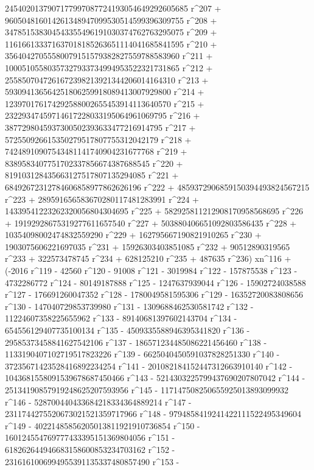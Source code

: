        2454020137907177997087724193054649292605685 r^207 + 
       960504816014261348947099530514599396309755 r^208 + 
       347851538304543355496191030374762763295075 r^209 + 
       116166133371637018185263651114041685841595 r^210 + 
       35640427055580079151579382827559788583960 r^211 + 
       10005105580357327933734994953522321731865 r^212 + 
       2558507047261672398213921344206014164310 r^213 + 
       593094136564251806259918089413007929800 r^214 + 
       123970176174292588002655453914113640570 r^215 + 
       23229347459714617228033195064961069795 r^216 + 
       3877298045937300502393633477216914795 r^217 + 
       572550926615350279517807755312042179 r^218 + 
       74248910907543481141740904231677768 r^219 + 
       8389583407751702337856674387688545 r^220 + 
       819103128435663127517807135294085 r^221 + 
       68492672312784606858977862626196 r^222 + 
       4859372906859150394493824567215 r^223 + 
       289591656583670280117481283991 r^224 + 
       14339541223262320056804304695 r^225 + 
       582925811212908170958568695 r^226 + 
       19192928675319277611657540 r^227 + 
       503880406651092803586435 r^228 + 
       10354098002474832559290 r^229 + 162795667190821910265 r^230 + 
       1903075606221697035 r^231 + 15926303403851085 r^232 + 
       90512890319565 r^233 + 322573478745 r^234 + 628125210 r^235 + 
       487635 r^236) xn^116 + (-2016 r^119 - 42560 r^120 - 
       91008 r^121 - 3019984 r^122 - 157875538 r^123 - 
       4732286772 r^124 - 80149187888 r^125 - 1247637939044 r^126 - 
       15902724038588 r^127 - 176691260047352 r^128 - 
       1780049581595306 r^129 - 16352720083808656 r^130 - 
       147040729853739980 r^131 - 1309688462530581742 r^132 - 
       11224607358225655962 r^133 - 89140681397602143704 r^134 - 
       654556129407735100134 r^135 - 4509335588946395341820 r^136 - 
       29585373458841627542106 r^137 - 
       186571234485086221456460 r^138 - 
       1133190407102719517823226 r^139 - 
       6625040450591037828251330 r^140 - 
       37235671423528416892234254 r^141 - 
       201082184152447312663910140 r^142 - 
       1043681558091539678687450466 r^143 - 
       5214303225799437690207807042 r^144 - 
       25134190857919248625207593956 r^145 - 
       117147508250655925013893099932 r^146 - 
       528700440433684218334364889214 r^147 - 
       2311744275520673021521359717966 r^148 - 
       9794858419241422111522495349604 r^149 - 
       40221485856205013811921910736854 r^150 - 
       160124554769777433395151369804056 r^151 - 
       618262644946683158600853234703162 r^152 - 
       2316161006994955391135337480857490 r^153 - 
